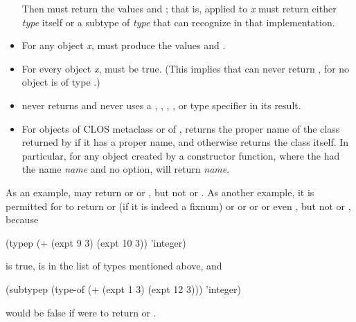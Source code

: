 \begin{defun}[Function]
\begin{new}
\begin{itemize}
Then
must return the values  and ; that is,  applied
to \emph{x} must return either \emph{type} itself or a subtype of \emph{type}
that  can recognize in that implementation.

\item
For any object \emph{x}, 
must produce the values  and .

\item
For every object \emph{x}, 
must be true.  (This implies that  can never return ,
for no object is of type .)

\item
{} never returns  and never uses
a , , , ,
or  type specifier in its result.

\item
For objects of CLOS metaclass  or of ,
 returns the proper name of the class returned by 
if it has a proper name, and otherwise returns the class itself.
In particular,
for any object created by a  constructor function,
where the  had the name \emph{name} and no  option,
 will return \emph{name}.
\end{itemize}

As an example, 
may return  or  or ,
but not  or .
As another example, it is permitted for
 to return
 or  (if it is indeed a fixnum) or
 or  or 
or even , but not  or , because
\begin{lisp}
(typep (+ (expt 9 3) (expt 10 3)) 'integer)
\end{lisp}
is true,  is in the list of types mentioned above, and
\begin{lisp}
(subtypep (type-of (+ (expt 1 3) (expt 12 3))) 'integer)
\end{lisp}
would be false if  were to return  or .
\end{new}
\end{defun}



